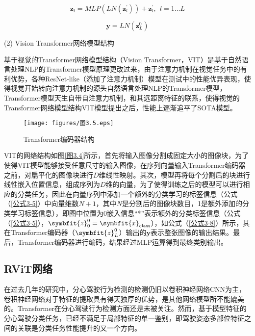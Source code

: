 \begin{equation}\label{公式3-7}
	\mathbf{z}_l=MLP\left(LN\left(\mathbf{z}_l^\prime\right)\right)+\mathbf{z}_l^\prime,\ \ l=1\ldots L
\end{equation}


\begin{equation}\label{公式3-8}
	\mathbf{y}=LN\left(\mathbf{z}_L^0\right)
\end{equation}

(2)	Vision Transformer网络模型结构

基于视觉的Transformer网络模型结构（Vision Transformer，VIT）是基于自然语言处理NLP的Transformer模型原理更改过来，由于注意力机制在视觉任务中的有利优势，各种ResNet-like（添加了注意力机制）模型在测试中的性能优异表现，使得视觉开始转向注意力机制的源头自然语言处理NLP的Transformer模型，Transformer模型天生自带自注意力机制，和其远距离特征的联系，使得视觉的Transformer网络模型结构VIT模型提出之后，性能上逐渐追平了SOTA模型。


\begin{figure}[!ht]
	\centering
	\texttt{[image: figures/图3.5.eps]}
	\caption{Transformer编码器结构}\label{图3.5}
\end{figure}

VIT的网络结构如图\ref{图3.4}所示，首先将输入图像分割成固定大小的图像块，为了使得VIT模型能够接受任意尺寸的输入图像，在序列向量输入Transformer编码器之前，对扁平化的图像块进行$D$维线性映射。其次，模型再将每个分割后的块进行线性嵌入位置信息，组成序列为$D$维的向量，为了使得训练之后的模型可以进行相应的分类任务，因此在向量序列中添加一个额外的分类学习的标签信息（公式（\ref{公式3-5}）中向量维数$N+1$，其中$N$是分割后的图像块数目，1是额外添加的分类学习标签信息），即图中位置为0嵌入信息“*”表示额外的分类标签信息（公式（\ref{公式3-5}），$\symbfit{z}_0^0=\symbfit{x}_{\mathrm{class}}$），如公式（\ref{公式3-8}）所示，其在Transformer编码器（$\symbfit{z}_L^0$）输出的$\mathbf{y}$表示整张图像的输出结果。最后，Transformer编码器进行编码，结果经过MLP运算得到最终类别输出。

\subsection{RViT网络}

在过去几年的研究中，分心驾驶行为检测的检测仍旧以卷积神经网络CNN为主，卷积神经网络对于特征的提取具有得天独厚的优势，是其他网络模型所不能媲美的。Transformer在分心驾驶行为检测方面还是未被关注。然而，基于模型特征的分心驾驶分类任务，已经不满足于局部特征的单一鉴别，即驾驶姿态多部位特征之间的关联是分类任务性能提升的又一个方向。

